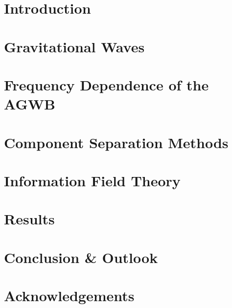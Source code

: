 \documentclass[twoside, 11pt, openany]{book}
\let\chaptername\relax
\begin{document}
\newpage
\begin{spacing}{1}
\tableofcontents
{}
\end{spacing}
\newpage

\pagestyle{fancy}
\renewcommand{\chaptermark}[1]{\markboth{#1}{#1}}
\fancyhead[R]{}
\fancyhead[L]{\MakeUppercase{\chaptername\ \thechapter\ --\ \leftmark} \newline
                \vspace{-0.7cm}
                \noindent\rule{\linewidth}{0.4pt}}
\chapter{Introduction}


\chapter{Gravitational Waves}
\label{gw_chapter}


\chapter{Frequency Dependence of the AGWB}
\label{frequency_chapter}


\chapter{Component Separation Methods}
\label{comp_sep}


\chapter{Information Field Theory}
\label{ift_chapter}


\chapter{Results}
\label{results_chapter}


\chapter{Conclusion \& Outlook}
\label{conclusion_chapter}


\appendix


\chapter*{Acknowledgements}



\newpage
{}
\printbibliography
\end{document}
